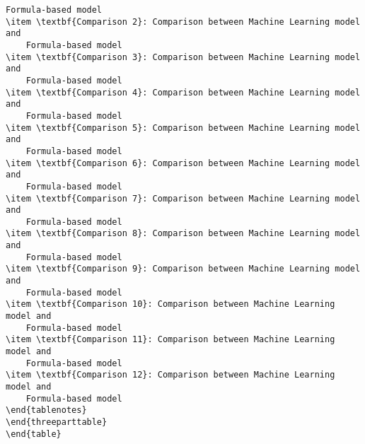 \documentclass[11pt]{article}
\begin{document}
\begin{Verbatim}[tabsize=4]
	Formula-based model
\item \textbf{Comparison 2}: Comparison between Machine Learning model and
	Formula-based model
\item \textbf{Comparison 3}: Comparison between Machine Learning model and
	Formula-based model
\item \textbf{Comparison 4}: Comparison between Machine Learning model and
	Formula-based model
\item \textbf{Comparison 5}: Comparison between Machine Learning model and
	Formula-based model
\item \textbf{Comparison 6}: Comparison between Machine Learning model and
	Formula-based model
\item \textbf{Comparison 7}: Comparison between Machine Learning model and
	Formula-based model
\item \textbf{Comparison 8}: Comparison between Machine Learning model and
	Formula-based model
\item \textbf{Comparison 9}: Comparison between Machine Learning model and
	Formula-based model
\item \textbf{Comparison 10}: Comparison between Machine Learning model and
	Formula-based model
\item \textbf{Comparison 11}: Comparison between Machine Learning model and
	Formula-based model
\item \textbf{Comparison 12}: Comparison between Machine Learning model and
	Formula-based model
\end{tablenotes}
\end{threeparttable}
\end{table}

\end{Verbatim}
\end{document}
